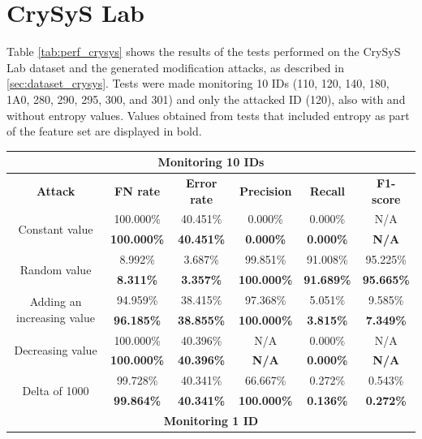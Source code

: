 \section{CrySyS Lab}

Table \ref{tab:perf_crysys} shows the results of the tests performed on the CrySyS Lab dataset and the generated modification attacks, as described in \ref{sec:dataset_crysys}. Tests were made monitoring 10 IDs (110, 120, 140, 180, 1A0, 280, 290, 295, 300, and 301) and only the attacked ID (120), also with and without entropy values. Values obtained from tests that included entropy as part of the feature set are displayed in bold.

\begin{table}
    \centering
    \begin{tabular}{*{6}{c}}
        \toprule 
        \multicolumn{6}{c}{\textbf{Monitoring 10 IDs}}\\
        \midrule
        \textbf{Attack} & \textbf{FN rate} & \textbf{Error rate} & \textbf{Precision} & \textbf{Recall} & \textbf{F1-score}\\
        \midrule
        \multirow{2}{*}{Constant value} & 100.000\% & 40.451\% & 0.000\% & 0.000\% & N/A\\
        & \textbf{100.000\%} & \textbf{40.451\%} & \textbf{0.000\%} & \textbf{0.000\%} & \textbf{N/A}\\
        \multirow{2}{*}{Random value} & 8.992\% & 3.687\% & 99.851\% & 91.008\% & 95.225\%\\
        & \textbf{8.311\%} & \textbf{3.357\%} & \textbf{100.000\%} & \textbf{91.689\%} & \textbf{95.665\%}\\
        \multirow{2}{*}{Adding an increasing value} & 94.959\% & 38.415\% & 97.368\% & 5.051\% & 9.585\%\\
        & \textbf{96.185\%} & \textbf{38.855\%} & \textbf{100.000\%} & \textbf{3.815\%} & \textbf{7.349\%}\\
        \multirow{2}{*}{Decreasing value} & 100.000\% & 40.396\% & N/A & 0.000\% & N/A\\
        & \textbf{100.000\%} & \textbf{40.396\%} & \textbf{N/A} & \textbf{0.000\%} & \textbf{N/A}\\
        \multirow{2}{*}{Delta of 1000} & 99.728\% & 40.341\% & 66.667\% & 0.272\% & 0.543\%\\
        & \textbf{99.864\%} & \textbf{40.341\%} & \textbf{100.000\%} & \textbf{0.136\%} & \textbf{0.272\%}\\
        \bottomrule
        \toprule
        \multicolumn{6}{c}{\textbf{Monitoring 1 ID}}\\

\end{tabular}
\end{table}
